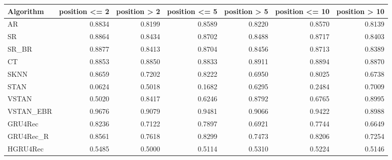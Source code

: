 \begin{tabular}{lrrrrrr}
\toprule
 Algorithm &  position <= 2 &  position > 2 &  position <= 5 &  position > 5 &  position <= 10 &  position > 10 \\
\midrule
        AR &         0.8834 &        0.8199 &         0.8589 &        0.8220 &          0.8570 &         0.8139 \\
        SR &         0.8864 &        0.8434 &         0.8702 &        0.8488 &          0.8717 &         0.8403 \\
     SR\_BR &         0.8877 &        0.8413 &         0.8704 &        0.8456 &          0.8713 &         0.8389 \\
        CT &         0.8853 &        0.8850 &         0.8833 &        0.8911 &          0.8894 &         0.8870 \\
      SKNN &         0.8659 &        0.7202 &         0.8222 &        0.6950 &          0.8025 &         0.6738 \\
      STAN &         0.0624 &        0.5018 &         0.1682 &        0.6295 &          0.2484 &         0.7009 \\
     VSTAN &         0.5020 &        0.8417 &         0.6246 &        0.8792 &          0.6765 &         0.8995 \\
 VSTAN\_EBR &         0.9676 &        0.9079 &         0.9481 &        0.9066 &          0.9422 &         0.8988 \\
   GRU4Rec &         0.8236 &        0.7122 &         0.7897 &        0.6921 &          0.7744 &         0.6649 \\
 GRU4Rec\_R &         0.8561 &        0.7618 &         0.8299 &        0.7473 &          0.8206 &         0.7254 \\
  HGRU4Rec &         0.5485 &        0.5000 &         0.5114 &        0.5310 &          0.5224 &         0.5146 \\
\bottomrule
\end{tabular}
